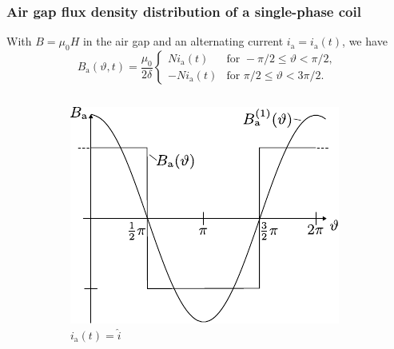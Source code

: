 \begin{frame}
	\frametitle{Air gap flux density distribution of a single-phase coil}
    With $B=\mu_0 H$ in the air gap and an alternating current $i_\mathrm{a} = i_\mathrm{a}(t)$, we have
    \begin{equation}
        B_\mathrm{a}(\vartheta, t) = \frac{\mu_0}{2\delta} \begin{cases}
            N i_\mathrm{a}(t) & \text{for } -\pi/2 \leq \vartheta < \pi/2, \\
            -N i_\mathrm{a}(t) & \text{for } \pi/2 \leq \vartheta < 3\pi/2.
        \end{cases}
    \end{equation}
    \begin{figure}
        \begin{columns}
            \begin{column}{0.7\textwidth}
                \centering
		\begin{subfigure}[b]{0.45\textwidth}
			\centering
			\includegraphics[width=\textwidth]{fig/lec05/B_single_phase_full_current.pdf}
			\caption{$i_\mathrm{a}(t) = \hat{i}$}
		\end{subfigure}
		\hfill
		\begin{subfigure}[b]{0.45\textwidth}
			\centering

\end{subfigure}
\end{column}
\end{columns}
\end{figure}
\end{frame}
